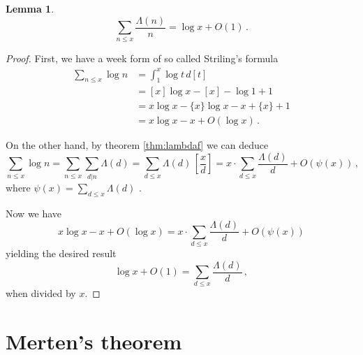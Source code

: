 \documentclass{article}
\theoremstyle{definition}
\newtheorem{lemma}[subsubsection]{Lemma}
\begin{document}
\begin{lemma}
\label{lemma:lambdadd}
\begin{equation*}
    \sum_{n\leq x} \frac{\Lambda(n)}{n} = \log x + O(1)\,.
\end{equation*}
\begin{proof}
First, we have a week form of so called Striling's formula
\begin{align*}
    \sum_{n\leq x} \log n & = \int_1^x \log t\,d[t]\\
    & = [x]\log x - [x] - \log 1 + 1\\
    & = x\log x - \{x\}\log x - x + \{x\} + 1\\
    & = x\log x - x + O(\log x)\,.
\end{align*}

On the other hand, by theorem \ref{thm:lambdaf} we can deduce
\begin{equation*}
    \sum_{n\leq x} \log n = \sum_{n\leq x} \sum_{d\vert n} \Lambda(d) = \sum_{d\leq x} \Lambda(d)\,\left[\frac{x}{d}\right] = x\cdot\sum_{d\leq x} \frac{\Lambda(d)}{d} + O(\psi(x))\,,
\end{equation*}
where $\psi(x)=\sum_{d\leq x} \Lambda(d)$ \cite{HardyWright}.

Now we have
\begin{equation*}
    x\log x - x + O(\log x) = x\cdot\sum_{d\leq x} \frac{\Lambda(d)}{d} + O(\psi(x))
\end{equation*}
yielding \cite{Goldmakher} the desired result
\begin{equation*}
    \log x + O(1) = \sum_{d\leq x} \frac{\Lambda(d)}{d}\,,
\end{equation*}
when divided by $x$.

\end{proof}
\end{lemma}

\section{Merten's theorem}
\end{document}
